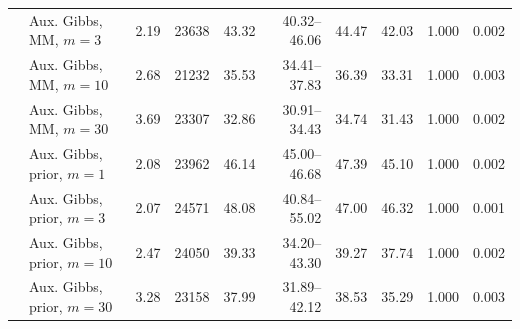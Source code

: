 \begin{tabular}{ll rrrrrrrr}
 & Aux. Gibbs, MM, $m{=}3$ & 2.19 & 23638 & 43.32 & 40.32--46.06 & 44.47 & 42.03 & 1.000 & 0.002 \\
 & Aux. Gibbs, MM, $m{=}10$ & 2.68 & 21232 & 35.53 & 34.41--37.83 & 36.39 & 33.31 & 1.000 & 0.003 \\
 & Aux. Gibbs, MM, $m{=}30$ & 3.69 & 23307 & 32.86 & 30.91--34.43 & 34.74 & 31.43 & 1.000 & 0.002 \\
 & Aux. Gibbs, prior, $m{=}1$ & 2.08 & 23962 & 46.14 & 45.00--46.68 & 47.39 & 45.10 & 1.000 & 0.002 \\
 & Aux. Gibbs, prior, $m{=}3$ & 2.07 & 24571 & 48.08 & 40.84--55.02 & 47.00 & 46.32 & 1.000 & 0.001 \\
 & Aux. Gibbs, prior, $m{=}10$ & 2.47 & 24050 & 39.33 & 34.20--43.30 & 39.27 & 37.74 & 1.000 & 0.002 \\
 & Aux. Gibbs, prior, $m{=}30$ & 3.28 & 23158 & 37.99 & 31.89--42.12 & 38.53 & 35.29 & 1.000 & 0.003 \\
\bottomrule
\end{tabular}
